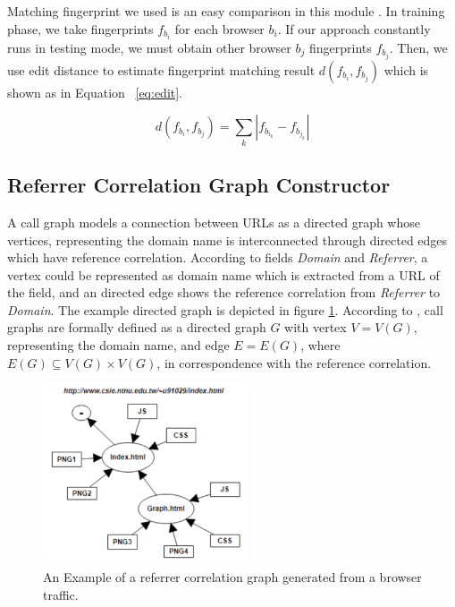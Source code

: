 Matching fingerprint we used is an easy comparison in this module \cite{bortolameotti2017decanter}. In training phase, we take fingerprints $f_{b_{i}}$ for each browser $b_{i}$. If our approach constantly runs in testing mode, we must obtain other browser $b_{j}$ fingerprints $f_{b_{j}}$. Then, we use edit distance to estimate fingerprint matching result $d(f_{b_{i}}, f_{b_{j}}) $ which is shown as in Equation ~\ref{eq:edit}.

\begin{equation}
        \label{eq:edit}
        d(f_{b_{i}}, f_{b_{j}}) = \sum_k \left |  f_{b_{i_{k}}} - f_{b_{j_{k}}} \right |  
\end{equation}

\subsection{Referrer Correlation Graph Constructor}

A call graph models a connection between URLs as a directed graph whose vertices, representing the domain name is interconnected through directed edges which have reference correlation. According to fields {\em Domain} and {\em Referrer}, a vertex could be represented as domain name which is extracted from a URL of the field, and an directed edge shows the reference correlation from {\em Referrer} to {\em Domain}. The example directed graph is depicted in figure \ref{fig:ref_graph}. According to \cite{kinable2011malware}, call graphs are formally defined as a directed graph $G$ with vertex $V = V(G)$, representing the domain name, and edge $E = E(G)$, where $E(G) \subseteq V(G) \times V(G) $, in correspondence with the reference correlation.

\begin{figure}[!t]
\centering
\includegraphics[width=170pt]{image/ref_graph.png}
\caption{An Example of a referrer correlation graph generated from a browser traffic.}
\label{fig:ref_graph}
\end{figure}


